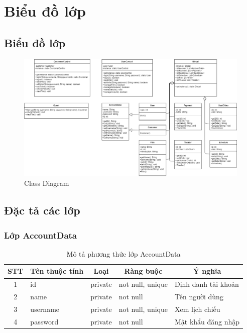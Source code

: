 \documentclass[a4paper, 12pt]{article}
\begin{document}
\section{Biểu đồ lớp}

\subsection{Biểu đồ lớp}

\begin{figure}[H]
	\begin{center}
		\includegraphics[angle=90,scale=0.49]{image/5.0.png}
		\caption{Class Diagram}
	\end{center}
\end{figure}

\subsection{Đặc tả các lớp}

\subsubsection{Lớp AccountData}
\begin{table}[h]
	\begin{center}
		\begin{tabular}{|c|l|c|l|l|}
			\hline
			STT & \multicolumn{1}{c|}{Tên thuộc tính} & Loại                         & \multicolumn{1}{c|}{Ràng buộc} & \multicolumn{1}{c|}{Ý nghĩa} \\ \hline
			1   & id                                  & \multicolumn{1}{l|}{private} & not null, unique               & Định danh tài khoản          \\ \hline
			2   & name                                & private                      & not null                       & Tên người dùng               \\ \hline
			3   & username                            & private                      & not null, unique               & Xem lịch chiếu               \\ \hline
			4   & password                            & private                      & not null                       & Mật khẩu đăng nhập           \\ \hline
			\end{tabular}
		\caption{Mô tả phương thức lớp AccountData}
	\end{center}
\end{table}
\end{document}
